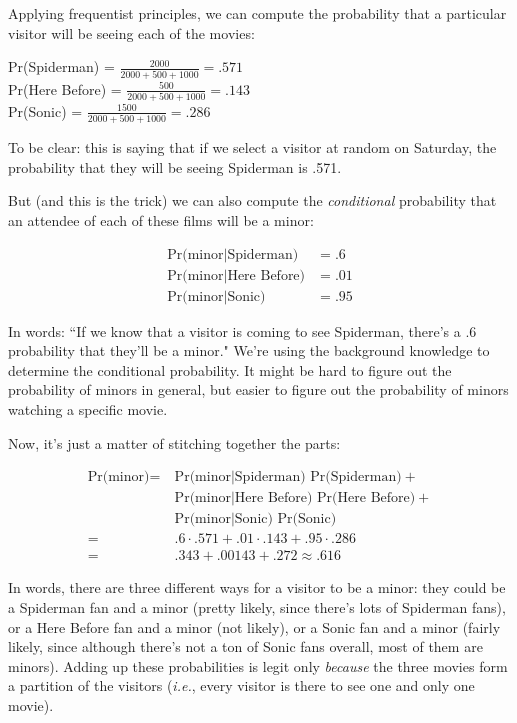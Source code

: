 Applying frequentist principles, we can compute the probability that a
particular visitor will be seeing each of the movies:

\begin{center}
Pr(Spiderman) = $\frac{2000}{2000+500+1000} = .571$ \\[.1in]
Pr(Here Before) = $\frac{500}{2000+500+1000} = .143$\\[.1in]
Pr(Sonic) = $\frac{1500}{2000+500+1000} = .286$
\end{center}

To be clear: this is saying that if we select a visitor at random on
Saturday, the probability that they will be seeing Spiderman is .571.

But (and this is the trick) we can also compute the \textit{conditional}
probability that an attendee of each of these films will be a minor:

\begin{align*}
\text{Pr(minor}|\text{Spiderman)} &= .6 \\
\text{Pr(minor}|\text{Here Before)} &= .01 \\
\text{Pr(minor}|\text{Sonic)} &= .95
\end{align*}

In words: ``If we know that a visitor is coming to see Spiderman, there's a .6
probability that they'll be a minor." We're using the background knowledge to
determine the conditional probability. It might be hard to figure out the
probability of minors in general, but easier to figure out the probability of
minors watching a specific movie.

Now, it's just a matter of stitching together the parts:

\begin{align*}
\text{Pr(minor)} = &\ \text{Pr(minor}|\text{Spiderman) Pr(Spiderman)} +  \\
&\ \text{Pr(minor}|\text{Here Before) Pr(Here Before)} +  \\
&\ \text{Pr(minor}|\text{Sonic) Pr(Sonic)}\\
= &\ .6 \cdot .571 + .01 \cdot .143 + .95 \cdot .286 \\
= &\ .343 + .00143 + .272 \approx .616
\end{align*}

In words, there are three different ways for a visitor to be a minor: they
could be a Spiderman fan and a minor (pretty likely, since there's lots of
Spiderman fans), or a Here Before fan and a minor (not likely), or a Sonic
fan and a minor (fairly likely, since although there's not a ton of Sonic
fans overall, most of them are minors). Adding up these probabilities is
legit only \textit{because} the three movies form a partition of the
visitors (\textit{i.e.}, every visitor is there to see one and only one
movie).

